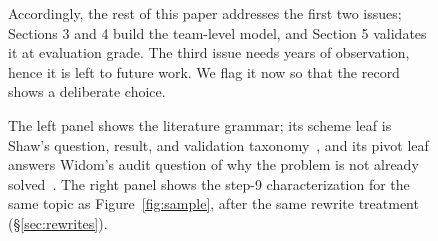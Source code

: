 \begin{figure}[t!]
{\begin{minipage}[t]{\dimexpr0.56\textwidth-2\fboxsep-2\fboxrule}
Accordingly, the rest of this paper addresses the first two
issues; Sections 3 and 4 build the team-level model, and
Section 5 validates it at evaluation grade.
The third issue needs years of observation, hence it is left to
future work.
We flag it now so that the record shows a deliberate choice.
\end{minipage}}
\vspace{1mm}
\caption{The left panel shows the literature grammar; its scheme
leaf is Shaw's question, result, and validation
taxonomy~\cite{shaw03}, and its pivot leaf answers Widom's audit
question of why the problem is not already solved~\cite{widom06}.
The right panel shows the step-9 characterization for the same
topic as Figure~\ref{fig:sample}, after the same rewrite
treatment (\S\ref{sec:rewrites}).}
\label{fig:samplelit}
\end{figure}

